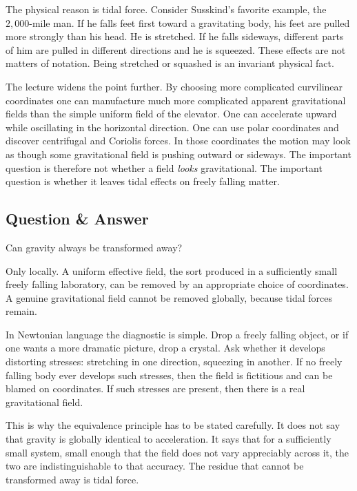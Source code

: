 The physical reason is tidal force.  Consider Susskind's favorite example, the \(2{,}000\)-mile man.  If he falls feet first toward a gravitating body, his feet are pulled more strongly than his head.  He is stretched.  If he falls sideways, different parts of him are pulled in different directions and he is squeezed.  These effects are not matters of notation.  Being stretched or squashed is an invariant physical fact.

The lecture widens the point further.  By choosing more complicated curvilinear coordinates one can manufacture much more complicated apparent gravitational fields than the simple uniform field of the elevator.  One can accelerate upward while oscillating in the horizontal direction.  One can use polar coordinates and discover centrifugal and Coriolis forces.  In those coordinates the motion may look as though some gravitational field is pushing outward or sideways.  The important question is therefore not whether a field \emph{looks} gravitational.  The important question is whether it leaves tidal effects on freely falling matter.

\subsection{Question \& Answer}

Can gravity always be transformed away?

Only locally.  A uniform effective field, the sort produced in a sufficiently small freely falling laboratory, can be removed by an appropriate choice of coordinates.  A genuine gravitational field cannot be removed globally, because tidal forces remain.

In Newtonian language the diagnostic is simple.  Drop a freely falling object, or if one wants a more dramatic picture, drop a crystal.  Ask whether it develops distorting stresses: stretching in one direction, squeezing in another.  If no freely falling body ever develops such stresses, then the field is fictitious and can be blamed on coordinates.  If such stresses are present, then there is a real gravitational field.

This is why the equivalence principle has to be stated carefully.  It does not say that gravity is globally identical to acceleration.  It says that for a sufficiently small system, small enough that the field does not vary appreciably across it, the two are indistinguishable to that accuracy.  The residue that cannot be transformed away is tidal force.


